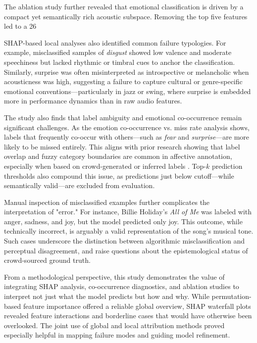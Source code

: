 \documentclass{article}
\begin{document}
The ablation study further revealed that emotional classification is driven by a compact yet semantically rich acoustic subspace. Removing the top five features led to a 26%

SHAP-based local analyses also identified common failure typologies. For example, misclassified samples of \textit{disgust} showed low valence and moderate speechiness but lacked rhythmic or timbral cues to anchor the classification. Similarly, surprise was often misinterpreted as introspective or melancholic when acousticness was high, suggesting a failure to capture cultural or genre-specific emotional conventions—particularly in jazz or swing, where surprise is embedded more in performance dynamics than in raw audio features.

The study also finds that label ambiguity and emotional co-occurrence remain significant challenges. As the emotion co-occurrence vs. miss rate analysis shows, labels that frequently co-occur with others—such as \textit{fear} and \textit{surprise}—are more likely to be missed entirely. This aligns with prior research showing that label overlap and fuzzy category boundaries are common in affective annotation, especially when based on crowd-generated or inferred labels \parencite{Kim2024, Yang2024}. Top-$k$ prediction thresholds also compound this issue, as predictions just below cutoff—while semantically valid—are excluded from evaluation.

Manual inspection of misclassified examples further complicates the interpretation of "error." For instance, Billie Holiday’s \textit{All of Me} was labeled with anger, sadness, and joy, but the model predicted only joy. This outcome, while technically incorrect, is arguably a valid representation of the song’s musical tone. Such cases underscore the distinction between algorithmic misclassification and perceptual disagreement, and raise questions about the epistemological status of crowd-sourced ground truth.

From a methodological perspective, this study demonstrates the value of integrating SHAP analysis, co-occurrence diagnostics, and ablation studies to interpret not just what the model predicts but how and why. While permutation-based feature importance offered a reliable global overview, SHAP waterfall plots revealed feature interactions and borderline cases that would have otherwise been overlooked. The joint use of global and local attribution methods proved especially helpful in mapping failure modes and guiding model refinement.
\end{document}
